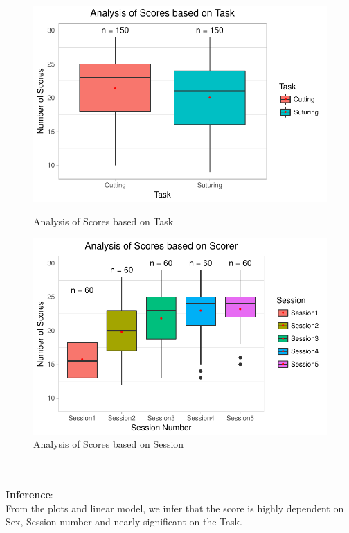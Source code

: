 \documentclass[12pt,epsf]{report}
\begin{document}
{\begin{figure}[!htb]
	\begin{minipage}[c]{0.5\linewidth}
	\includegraphics[width=\linewidth]{TaskVsScore.pdf}
	\caption{Analysis of Scores based on Task}
	\end{minipage}
	\hfill
	\begin{minipage}[c]{0.5\linewidth}
	\includegraphics[width=\linewidth]{SessionVsScore.pdf}
	\caption{Analysis of Scores based on Session}
	\end{minipage}
\end{figure}\\
\\
\textbf{Inference}:\\
From the plots and linear model, we infer that the score is highly dependent on Sex, Session number and nearly significant on the Task.\\
\\
\\
\FloatBarrier
}
\end{document}
